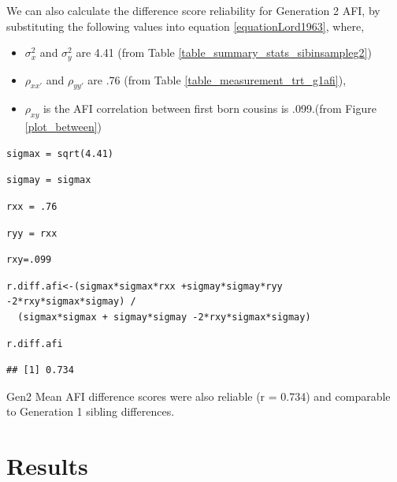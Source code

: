 \documentclass[a4paper,man,apacite,natbib,12pt]{apa6}\usepackage[]{graphicx}\usepackage[]{color}
\makeatletter
\newenvironment{kframe}{%
 \def\at@end@of@kframe{}%
 \ifinner\ifhmode%
  \def\at@end@of@kframe{\end{minipage}}%
  \begin{minipage}{\columnwidth}%
 \fi\fi%
 \def\FrameCommand##1{\hskip\@totalleftmargin \hskip-\fboxsep
 \colorbox{shadecolor}{##1}\hskip-\fboxsep
     \hskip-\linewidth \hskip-\@totalleftmargin \hskip\columnwidth}%
 \MakeFramed {\advance\hsize-\width
   \@totalleftmargin\z@ \linewidth\hsize
   \@setminipage}}%
 {\par\unskip\endMakeFramed%
 \at@end@of@kframe}
\newenvironment{knitrout}{}{} %
\makeatother
\begin{document}
We can also calculate the difference score reliability for Generation 2 AFI, by substituting the following values into equation \ref{equationLord1963},
where, \begin{itemize}
\item $\sigma_{x}^{2}$ and $\sigma_{y}^{2}$ are 4.41 (from Table \vref{table_summary_stats_sibinsampleg2}) %
\item $\rho_{xx'}$ and $\rho_{yy'}$ are .76 (from Table \vref{table_measurement_trt_g1afi}), 
\item $\rho_{xy}$ is the AFI correlation between first born cousins is .099.(from Figure \vref{plot_between})\end{itemize}
\begin{knitrout}
\color{fgcolor}\begin{kframe}
\begin{lstlisting}[style=Rsettings]
sigmax = sqrt(4.41)\end{lstlisting}
\begin{lstlisting}[style=Rsettings]
sigmay = sigmax\end{lstlisting}
\begin{lstlisting}[style=Rsettings]
rxx = .76\end{lstlisting}
\begin{lstlisting}[style=Rsettings]
ryy = rxx\end{lstlisting}
\begin{lstlisting}[style=Rsettings]
rxy=.099\end{lstlisting}
\begin{lstlisting}[style=Rsettings]
r.diff.afi<-(sigmax*sigmax*rxx +sigmay*sigmay*ryy -2*rxy*sigmax*sigmay) / 
  (sigmax*sigmax + sigmay*sigmay -2*rxy*sigmax*sigmay)\end{lstlisting}
\begin{lstlisting}[style=Rsettings]
r.diff.afi\end{lstlisting}
\begin{lstlisting}[style=Rsettings]
## [1] 0.734
\end{lstlisting}
\end{kframe}
\end{knitrout}
 Gen2 Mean AFI difference scores were also reliable (r = 0.734) and comparable to Generation 1 sibling differences.
\section{Results}

%
\end{document}
